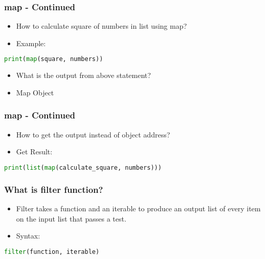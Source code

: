 \documentclass[14pt]{beamer}
\begin{document}
    \begin{frame}[containsverbatim]
        \frametitle{map - Continued}
        \begin{itemize}
            \item How to calculate square of numbers in list using map?
            \item \alert{Example:}
        \end{itemize}
        \begin{lstlisting}[language=Python]
	print(map(square, numbers))
        \end{lstlisting}

        \begin{itemize}
            \item What is the output from above statement?
            \item \alert{Map Object}
        \end{itemize}
    \end{frame}

    \begin{frame}[containsverbatim]
        \frametitle{map - Continued}
        \begin{itemize}
            \item How to get the output instead of object address?
            \item \alert{Get Result:}
        \end{itemize}
        \begin{lstlisting}[language=Python]
	print(list(map(calculate_square, numbers)))
        \end{lstlisting}
    \end{frame}

    \begin{frame}[containsverbatim]
        \frametitle{What is filter function?}
        \begin{itemize}
            \item Filter takes a function and an iterable to produce an output list of every item on the input list that passes a test.
            \item \alert{Syntax:}
        \end{itemize}
        \begin{lstlisting}[language=Python]
            filter(function, iterable)
        \end{lstlisting}
    \end{frame}
    
\end{document}
